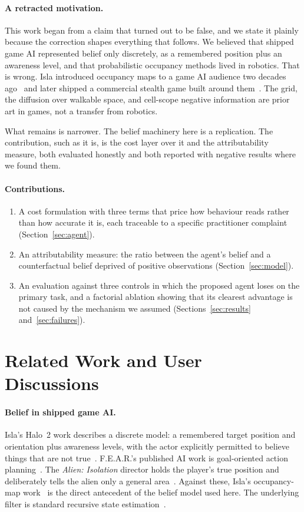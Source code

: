 \documentclass{article}
\begin{document}
\paragraph{A retracted motivation.}
This work began from a claim that turned out to be false, and we state it plainly because the
correction shapes everything that follows. We believed that shipped game AI represented belief
only discretely, as a remembered position plus an awareness level, and that probabilistic
occupancy methods lived in robotics. That is wrong. Isla introduced occupancy maps to a game AI
audience two decades ago~\cite{isla2006occupancy} and later shipped a commercial stealth game
built around them~\cite{isla2013thirdeye}. The grid, the diffusion over walkable space, and
cell-scope negative information are prior art in games, not a transfer from robotics.

What remains is narrower. The belief machinery here is a replication. The contribution, such as
it is, is the cost layer over it and the attributability measure, both evaluated honestly and
both reported with negative results where we found them.

\paragraph{Contributions.}
\begin{enumerate}
\item A cost formulation with three terms that price how behaviour reads rather than how
accurate it is, each traceable to a specific practitioner complaint (Section~\ref{sec:agent}).
\item An attributability measure: the ratio between the agent's belief and a counterfactual
belief deprived of positive observations (Section~\ref{sec:model}).
\item An evaluation against three controls in which the proposed agent loses on the primary
task, and a factorial ablation showing that its clearest advantage is not caused by the
mechanism we assumed (Sections~\ref{sec:results} and~\ref{sec:failures}).
\end{enumerate}

\section{Related Work and User Discussions}

\paragraph{Belief in shipped game AI.}
Isla's Halo~2 work describes a discrete model: a remembered target position and orientation
plus awareness levels, with the actor explicitly permitted to believe things that are not
true~\cite{isla2005halo2}. F.E.A.R.'s published AI work is goal-oriented action
planning~\cite{orkin2006fear}. The \emph{Alien: Isolation} director holds the player's true
position and deliberately tells the alien only a general area~\cite{tommy2017alien}. Against
these, Isla's occupancy-map work~\cite{isla2006occupancy,isla2013thirdeye} is the direct
antecedent of the belief model used here. The underlying filter is standard recursive state
estimation~\cite{thrun2005probabilistic}.
\end{document}
